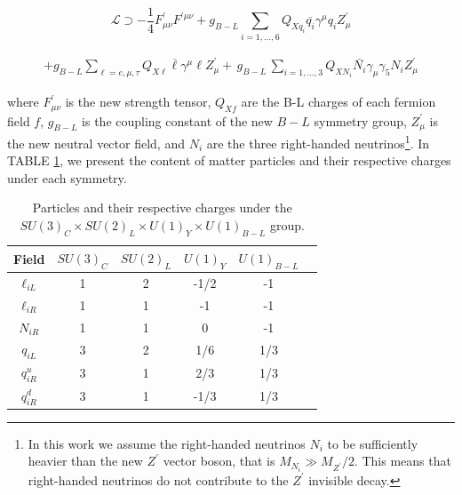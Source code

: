 \documentclass[aps,prev,twocolumn,preprintnumbers,floatfix,nofootinbib]{revtex4-1}
\begin{document}
%

\begin{equation*}
    \mathcal{L}\supset -\frac{1}{4}{F}^{\prime}_{\mu\nu}{F}^{'\mu\nu} + {g}_{B-L}\sum_{i=1,...,6} {Q}_{X{q}_{i}} \overline{q_{i}} {\gamma}^{\mu} q_{i} {Z}^{\prime}_{\mu}
\end{equation*}

\begin{align}
 +{g}_{B-L}\sum_{\ell=e,\mu,\tau} {Q}_{X\ell} \overline{\ell} {\gamma}^{\mu} \ell {Z}^{\prime}_{\mu}  + \, g_{B-L}\,\sum_{i=1,...,3} {Q}_{X{N}_{i}} \bar{N_i} \gamma_\mu \gamma_5 N_i {Z}^{\prime}_{\mu}
    \label{relevant_lagrangian}    
\end{align}

\noindent where $F^{\prime}_{\mu\nu}$ is the new strength tensor, $Q_{Xf}$ are the B-L charges of each fermion field $f$, $g_{B-L}$ is the coupling constant of the new $B-L$ symmetry group, ${Z}^{\prime}_{\mu}$ is the new neutral vector field, and ${N}_{i}$ are the three right-handed neutrinos\footnote{In this work we assume the right-handed neutrinos ${N}_{i}$ to be sufficiently heavier than the new ${Z}^{\prime}$ vector boson, that is ${M}_{{N}_{i}} \gg {M}_{{Z}^{\prime}}/2$. This means that right-handed neutrinos do not contribute to the ${Z}^{\prime}$ invisible decay.}. In TABLE \ref{table1}, we present the content of matter particles and their respective charges under each symmetry. 

\begin{table}[h]
\begin{tabular}{|c|c|c|c|c|c|}
\hline
Field & $SU(3)_{C}$ & $SU(2)_{L}$ & $U(1)_{Y}$ & $U(1)_{B-L}$  \\ \hline
 ${\ell}_{iL}$ & 1 & 2 & -1/2 & -1  \\ \hline
 ${\ell}_{iR}$ & 1 & 1 & -1 & -1  \\ \hline
 ${N}_{iR}$ & 1 & 1 & 0 & -1 \\ \hline
 ${q}_{iL}$ & 3 & 2 & 1/6 & 1/3  \\ \hline
 ${q}^{u}_{iR}$ & 3 & 1 & 2/3 & 1/3  \\ \hline
 ${q}^{d}_{iR}$ & 3 & 1 & -1/3 & 1/3  \\ \hline
\end{tabular}
\caption{Particles and their respective charges under the $SU(3)_{C} \times SU(2)_{L} \times U(1)_{Y} \times U(1)_{B-L}$ group.}
\label{table1}
\end{table}
\end{document}
